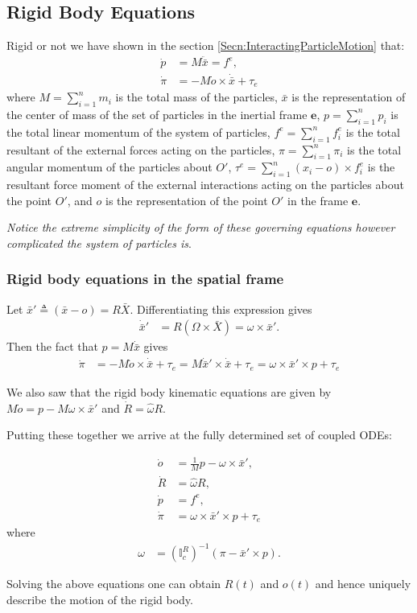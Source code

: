 \documentclass[graybox,envcountchap,sectrefs]{svmonoMuga}
\begin{document}
\subsection{Rigid Body Equations}
Rigid or not we have shown in the section \ref{Secn:InteractingParticleMotion} that:
\begin{align}
\dot{p}&=M\ddot{\bar{x}}=f^e,\\
\dot{\pi}&=-M\dot{o}\times \dot{\bar{x}}+\tau_e
\end{align} 
where $M=\sum_{i=1}^nm_i$ is the total mass of the particles, $\bar{x}$ is the representation of the center of mass of the set of particles in the inertial frame $\mathbf{e}$, $p=\sum_{i=1}^np_i$ is the total linear momentum of the system of particles, $f^e=\sum_{i=1}^n f_i^e$ is the total resultant of the external forces acting on the particles, $\pi =\sum_{i=1}^n\pi_i$ is the total angular momentum of the particles about $O'$, $\tau^e=\sum_{i=1}^n(x_i-o)\times f_i^e$ is the resultant force moment of the external interactions acting on the particles about the point $O'$, and $o$ is the representation of the point $O'$ in the frame $\mathbf{e}$.

\textit{Notice the extreme simplicity of the form of these governing equations however complicated the system of particles is}.

\subsubsection{Rigid body equations in the spatial frame}

Let $\bar{x}'\triangleq (\bar{x}-o)=R\bar{X}$. Differentiating this expression gives
\begin{align}
\dot{\bar{x}}'&=R(\Omega \times \bar{X})=\omega \times \bar{x}'.
\end{align}
Then the fact that $p=M\dot{\bar{x}}$ gives
\begin{align}
\dot{\pi}&=-M\dot{o}\times \dot{\bar{x}}+\tau_e=M\dot{\bar{x}}'\times \dot{\bar{x}}+\tau_e=\omega \times \bar{x}'\times p+\tau_e
\end{align} 

We also saw that the rigid body kinematic equations are given by $M\dot{o}=p-M\omega \times \bar{x}'$ and $\dot{R}=\widehat{\omega}R$.



Putting these together we arrive at the fully determined set of coupled ODEs:
\begin{svgraybox}
\begin{align}
\dot{o}&=\frac{1}{M}p-\omega \times \bar{x}',\\
\dot{R}&=\widehat{\omega}R,\\
\dot{p}&=f^e,\\
\dot{\pi}&=\omega \times \bar{x}'\times p+\tau_e
\end{align} 
where 
\begin{align}
\omega &=(\mathbb{I}_c^R)^{-1}\left(\pi-\bar{x}'\times p\right).
\end{align}
\end{svgraybox}
Solving the above equations one can obtain $R(t)$ and $o(t)$ and hence uniquely describe the motion of the rigid body.
\end{document}

